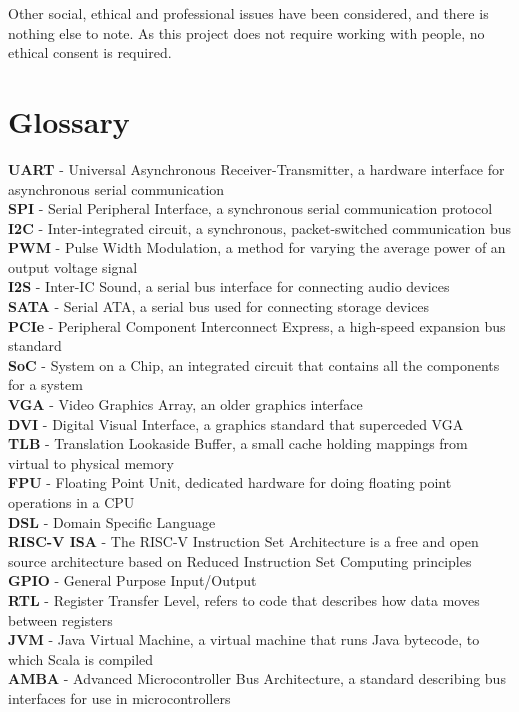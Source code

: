 \documentclass[a4paper,fleqn,12pt]{article}
\begin{document}
Other social, ethical and professional issues have been considered, and there is nothing else to note. As this project does not require working with people, no ethical consent is required.


\section{Glossary}
\textbf{UART} - Universal Asynchronous Receiver-Transmitter, a hardware interface for asynchronous serial communication\\
\textbf{SPI} - Serial Peripheral Interface, a synchronous serial communication protocol\\
\textbf{I2C} - Inter-integrated circuit, a synchronous, packet-switched communication bus\\
\textbf{PWM} - Pulse Width Modulation, a method for varying the average power of an output voltage signal\\
\textbf{I2S} - Inter-IC Sound, a serial bus interface for connecting audio devices\\
\textbf{SATA} - Serial ATA, a serial bus used for connecting storage devices\\
\textbf{PCIe} - Peripheral Component Interconnect Express, a high-speed expansion bus standard\\
\textbf{SoC} - System on a Chip, an integrated circuit that contains all the components for a system\\
\textbf{VGA} - Video Graphics Array, an older graphics interface\\
\textbf{DVI} - Digital Visual Interface, a graphics standard that superceded VGA\\
\textbf{TLB} - Translation Lookaside Buffer, a small cache holding mappings from virtual to physical memory \\
\textbf{FPU} - Floating Point Unit, dedicated hardware for doing floating point operations in a CPU\\
\textbf{DSL} - Domain Specific Language\\
\textbf{RISC-V ISA} - The RISC-V Instruction Set Architecture is a free and open source architecture based on Reduced Instruction Set Computing principles\\
\textbf{GPIO} - General Purpose Input/Output \\
\textbf{RTL} - Register Transfer Level, refers to code that describes how data moves between registers\\
\textbf{JVM} - Java Virtual Machine, a virtual machine that runs Java bytecode, to which Scala is compiled\\
\textbf{AMBA} - Advanced Microcontroller Bus Architecture, a standard describing bus interfaces for use in microcontrollers\\



\end{document}
